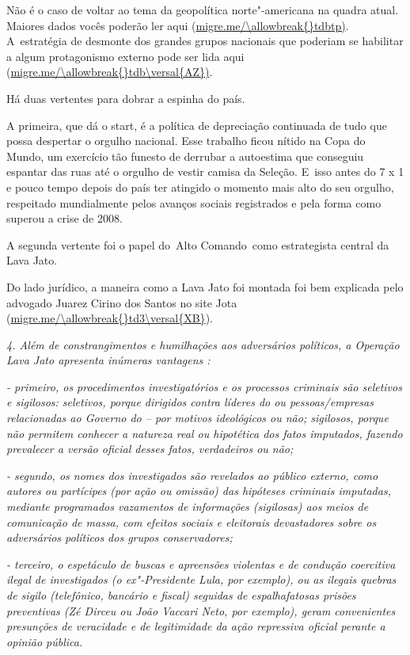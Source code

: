 Não é o caso de voltar ao tema da geopolítica norte"-americana na quadra
atual. Maiores dados vocês poderão ler aqui
(\url{migre.me/\allowbreak{}tdbtp)}. A~estratégia de desmonte dos grandes
grupos nacionais que poderiam se habilitar a algum protagonismo externo
pode ser lida aqui (\url{migre.me/\allowbreak{}tdb\versal{AZ})}.

Há duas vertentes para dobrar a espinha do país.

A primeira, que dá o start, é a política de depreciação continuada de
tudo que possa despertar o orgulho nacional. Esse trabalho ficou nítido
na Copa do Mundo, um exercício tão funesto de derrubar a autoestima que
conseguiu espantar das ruas até o orgulho de vestir camisa da Seleção. E~isso antes do 7 x 1 e pouco tempo depois do país ter atingido o momento
mais alto do seu orgulho, respeitado mundialmente pelos avanços sociais
registrados e pela forma como superou a crise de 2008.

A segunda vertente foi o papel do~Alto Comando~como estrategista central
da Lava Jato.

Do lado jurídico, a maneira como a Lava Jato foi montada foi bem
explicada pelo advogado Juarez Cirino dos Santos no site Jota
(\url{migre.me/\allowbreak{}td3\versal{XB}}).

\emph{4. Além de constrangimentos e humilhações aos adversários
políticos, a Operação Lava Jato apresenta inúmeras vantagens
\redondo{[…]}:}

\emph{- primeiro, os procedimentos investigatórios e os processos
criminais são seletivos e sigilosos: seletivos, porque dirigidos contra
líderes do  ou pessoas/\allowbreak{}empresas relacionadas ao Governo do  -- por
motivos ideológicos ou não; sigilosos, porque não permitem conhecer a
natureza real ou hipotética dos fatos imputados, fazendo prevalecer a
versão oficial desses fatos, verdadeiros ou não;}

\emph{- segundo, os nomes dos investigados são revelados ao público
externo, como autores ou partícipes (por ação ou omissão) das hipóteses
criminais imputadas, mediante programados vazamentos de informações
(sigilosas) aos meios de comunicação de massa, com efeitos sociais e
eleitorais devastadores sobre os adversários políticos dos grupos
conservadores;}

\emph{- terceiro, o espetáculo de buscas e apreensões violentas e de
condução coercitiva ilegal de investigados (o ex"-Presidente Lula, por
exemplo), ou as ilegais quebras de sigilo (telefônico, bancário e
fiscal) seguidas de espalhafatosas prisões preventivas (Zé Dirceu ou
João Vaccari Neto, por exemplo), geram convenientes presunções de
veracidade e de legitimidade da ação repressiva oficial perante a
opinião pública.}

